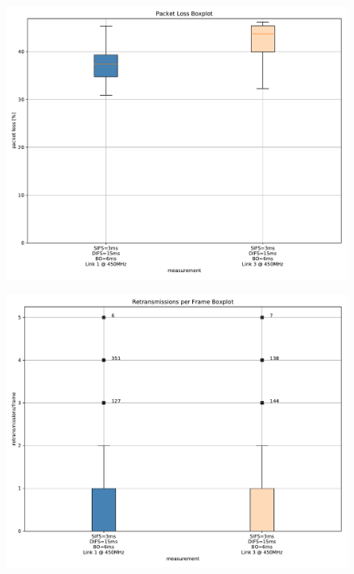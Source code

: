\documentclass{article}
\begin{document}
\begin{figure}
	\includegraphics[width=\textwidth]{rb_dual/link_1_3/boxplot/packet_loss_boxplot}
\end{figure}

\begin{figure}
	\includegraphics[width=\textwidth]{rb_dual/link_1_3/boxplot/retransmissions_per_frame_boxplot}
\end{figure}
\end{document}

